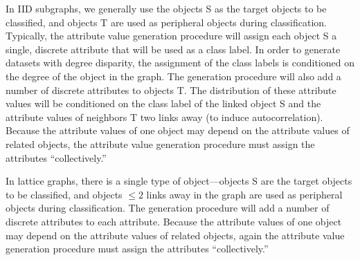 \documentclass[11pt]{article}
\begin{document}
In IID subgraphs, we generally use the objects S as the target objects to be classified, and objects T are used as peripheral objects during classification. 
Typically, the attribute value generation procedure will assign each object S a single, discrete attribute that will be used as a class label. In order to generate datasets with degree disparity, the assignment of the class labels is conditioned on the degree of the object in the graph. The generation procedure will also add a number of discrete attributes to objects T. The distribution of these attribute values will be conditioned on the class label of the linked object S and the attribute values of neighbors T two links away (to induce autocorrelation). Because the attribute values of one object may depend on the attribute values of related objects, the attribute value generation procedure must assign the attributes ``collectively.''

In lattice graphs, there is a single type of object---objects S are the target objects to be classified, and objects $\leq 2$ links away in the graph are used as peripheral objects during classification. The generation procedure will add a number of discrete attributes to each attribute. Because the attribute values of one object may depend on the attribute values of related objects, again the attribute value generation procedure must assign the attributes ``collectively.''
\end{document}
